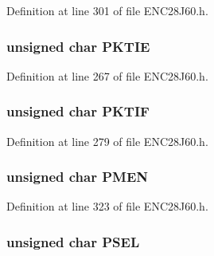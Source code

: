Definition at line 301 of file E\+N\+C28\+J60.\+h.

\hypertarget{union___r_e_g_a31f7570f8bbd4fa988a4d9926934f47b}{}
\subsubsection[{P\+K\+T\+I\+E}]{\setlength{\rightskip}{0pt plus 5cm}unsigned {\bf char} P\+K\+T\+I\+E}\label{union___r_e_g_a31f7570f8bbd4fa988a4d9926934f47b}


Definition at line 267 of file E\+N\+C28\+J60.\+h.

\hypertarget{union___r_e_g_aeed584499f7fd14810ae1a941d4f5b54}{}
\subsubsection[{P\+K\+T\+I\+F}]{\setlength{\rightskip}{0pt plus 5cm}unsigned {\bf char} P\+K\+T\+I\+F}\label{union___r_e_g_aeed584499f7fd14810ae1a941d4f5b54}


Definition at line 279 of file E\+N\+C28\+J60.\+h.

\hypertarget{union___r_e_g_a6ce81d7af13728325cf3efbaa1aeaf85}{}
\subsubsection[{P\+M\+E\+N}]{\setlength{\rightskip}{0pt plus 5cm}unsigned {\bf char} P\+M\+E\+N}\label{union___r_e_g_a6ce81d7af13728325cf3efbaa1aeaf85}


Definition at line 323 of file E\+N\+C28\+J60.\+h.

\hypertarget{union___r_e_g_ad6890a0b21bc5bd85c65c47425d32498}{}
\subsubsection[{P\+S\+E\+L}]{\setlength{\rightskip}{0pt plus 5cm}unsigned {\bf char} P\+S\+E\+L}\label{union___r_e_g_ad6890a0b21bc5bd85c65c47425d32498}


